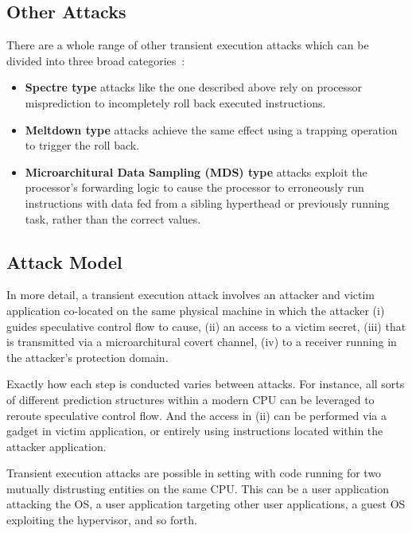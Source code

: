 \subsection{Other Attacks}
There are a whole range of other transient execution attacks which can be divided into three broad categories~\cite{hill:survey}:
\begin{itemize}
\item \textbf{Spectre type} attacks like the one described above rely on processor misprediction to incompletely roll back executed instructions.
\item \textbf{Meltdown type} attacks achieve the same effect using a trapping operation to trigger the roll back.
\item \textbf{Microarchitural Data Sampling (MDS) type} attacks exploit the processor's forwarding logic to cause the processor to erroneously run instructions with data fed from a sibling hyperthead or previously running task, rather than the correct values.
\end{itemize}

\subsection{Attack Model}
In more detail, a transient execution attack involves an attacker and victim application co-located on the same physical machine in which the attacker (i) guides speculative control flow to cause, (ii) an access to a victim secret, (iii) that is transmitted via a microarchitural covert channel, (iv) to a receiver running in the attacker's protection domain. 

Exactly how each step is conducted varies between attacks.
For instance, all sorts of different prediction structures within a modern CPU can be leveraged to reroute speculative control flow.
And the access in (ii) can be performed via a gadget in victim application, or entirely using instructions located within the attacker application.

Transient execution attacks are possible in setting with code running for two mutually distrusting entities on the same CPU.
This can be a user application attacking the OS, a user application targeting other user applications, a guest OS exploiting the hypervisor, and so forth.



